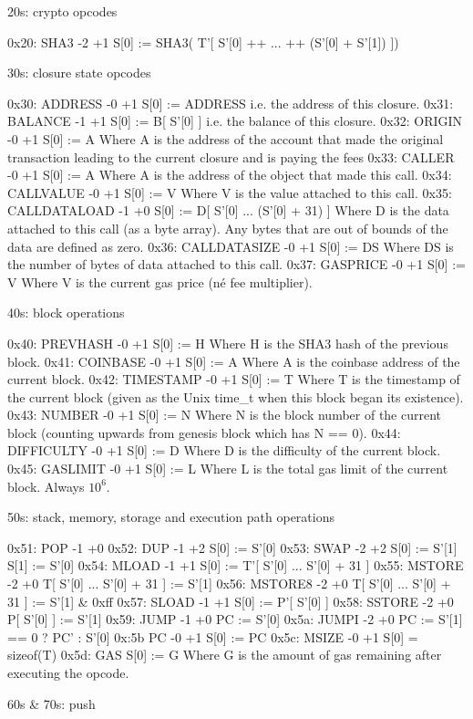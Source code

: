 \documentclass[9pt,oneside]{amsart}
\begin{document}
\begin{multicols}{2}
20s: crypto opcodes

0x20: SHA3 -2 +1
S[0] := SHA3( T'[ S'[0] ++ ... ++ (S'[0] + S'[1]) ])

30s: closure state opcodes

0x30: ADDRESS -0 +1
S[0] := ADDRESS
i.e. the address of this closure.
0x31: BALANCE -1 +1
S[0] := B[ S'[0] ]
i.e. the balance of this closure.
0x32: ORIGIN -0 +1
S[0] := A
Where A is the address of the account that made the original transaction leading to the current closure and is paying the fees
0x33: CALLER -0 +1
S[0] := A
Where A is the address of the object that made this call.
0x34: CALLVALUE -0 +1
S[0] := V
Where V is the value attached to this call.
0x35: CALLDATALOAD -1 +0
S[0] := D[ S'[0] ... (S'[0] + 31) ]
Where D is the data attached to this call (as a byte array).
Any bytes that are out of bounds of the data are defined as zero.
0x36: CALLDATASIZE -0 +1
S[0] := DS
Where DS is the number of bytes of data attached to this call.
0x37: GASPRICE -0 +1
S[0] := V
Where V is the current gas price (né fee multiplier).

40s: block operations

0x40: PREVHASH -0 +1
S[0] := H
Where H is the SHA3 hash of the previous block.
0x41: COINBASE -0 +1
S[0] := A
Where A is the coinbase address of the current block.
0x42: TIMESTAMP -0 +1
S[0] := T
Where T is the timestamp of the current block (given as the Unix time\_t when this block began its existence).
0x43: NUMBER -0 +1
S[0] := N
Where N is the block number of the current block (counting upwards from genesis block which has N == 0).
0x44: DIFFICULTY -0 +1
S[0] := D
Where D is the difficulty of the current block.
0x45: GASLIMIT -0 +1
S[0] := L
Where L is the total gas limit of the current block. Always $10^6$.

50s: stack, memory, storage and execution path operations

0x51: POP -1 +0
0x52: DUP -1 +2
S[0] := S'[0]
0x53: SWAP -2 +2
S[0] := S'[1]
S[1] := S'[0]
0x54: MLOAD -1 +1
S[0] := T'[ S'[0] ... S'[0] + 31 ]
0x55: MSTORE -2 +0
T[ S'[0] ... S'[0] + 31 ] := S'[1]
0x56: MSTORE8 -2 +0
T[ S'[0] ... S'[0] + 31 ] := S'[1] \& 0xff
0x57: SLOAD -1 +1
S[0] := P'[ S'[0] ]
0x58: SSTORE -2 +0
P[ S'[0] ] := S'[1]
0x59: JUMP -1 +0
PC := S'[0]
0x5a: JUMPI -2 +0
PC := S'[1] == 0 ? PC' : S'[0]
0x:5b PC -0 +1
S[0] := PC
0x5c: MSIZE -0 +1
S[0] = sizeof(T)
0x5d: GAS
S[0] := G
Where G is the amount of gas remaining after executing the opcode.

60s \& 70s: push


\end{multicols}
\end{document}
